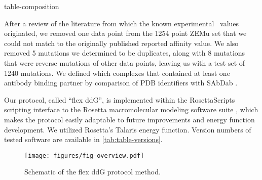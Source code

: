 {table-composition}

After a review of the literature from which the known experimental \ddg\ values originated, we removed one data point from the 1254 point ZEMu set that we could not match to the originally published reported affinity value. We also removed 5 mutations we determined to be duplicates, along with 8 mutations that were reverse mutations of other data points, leaving us with a test set of 1240 mutations.
We defined which complexes that contained at least one antibody binding partner by comparison of PDB identifiers with SAbDab \cite{dunbar_sabdab:_2014}.

Our protocol, called ``flex ddG'', is implemented within the RosettaScripts scripting interface to the Rosetta macromolecular modeling software suite \cite{fleishman_rosettascripts:_2011}, which makes the protocol easily adaptable to future improvements and energy function development. We utilized Rosetta's Talaris \cite{leaver-fay_chapter_2013,song_structure-guided_2011,shapovalov_smoothed_2011} energy function.
Version numbers of tested software are available in \cref{tab:table-versions}.

\begin{figure}
  \centering
  \texttt{[image: figures/fig-overview.pdf]}
    \caption{
      Schematic of the flex ddG protocol method.
  } \label{fig:figure-overview}
\end{figure}

